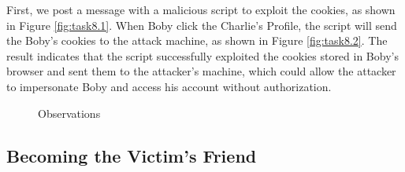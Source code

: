\documentclass[a4paper,11pt]{article}
\begin{document}
First, we post a message with a malicious script to exploit the cookies, as shown in Figure \ref{fig:task8.1}. When Boby click the Charlie's Profile, the script will send the Boby's cookies to the attack machine, as shown in Figure \ref{fig:task8.2}. The result indicates that the script successfully exploited the cookies stored in Boby's browser and sent them to the attacker's machine, which could allow the attacker to impersonate Boby and access his account without authorization.
\begin{figure}[h]
    \centering
    \hfill
    \hfill
    \caption{Observations}\label{fig:task8}
\end{figure}


\subsection{Becoming the Victim’s Friend}\label{sec:36}
\end{document}
